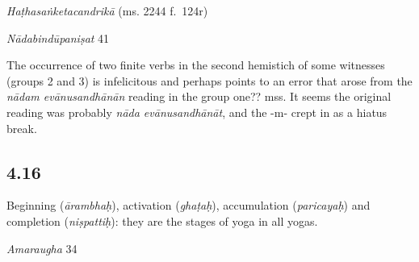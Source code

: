 \begin{ekdosis}
\begin{testimonia}[hp04_015]
\emph{Haṭhasaṅketacandrikā} (ms. 2244 f.~124r)
\begin{versinnote}
\end{versinnote}

\emph{Nādabindūpaniṣat} 41
\begin{versinnote}
\end{versinnote}
\end{testimonia}

\begin{philcomm}[hp04_015]
The occurrence of two finite verbs in the second hemistich of some witnesses (groups 2 and 3) is infelicitous and perhaps points to an error that arose from the \textit{nādam evānusandhānān} reading in the group one?? mss. It seems the original reading was probably \textit{nāda evānusandhānāt}, and the -m- crept in as a hiatus break.
\end{philcomm}

\subsection*{4.16}
\begin{translation}[hp04_016]
Beginning (\emph{ārambhaḥ}), activation (\emph{ghaṭaḥ}), accumulation (\emph{paricayaḥ}) and completion (\emph{niṣpattiḥ}): they are the stages of yoga in all yogas.
\end{translation}

\begin{sources}[hp04_016]
\emph{Amaraugha} 34
\begin{versinnote}
\tl{\var{cetasas tasya bhūmikāḥ ] $\beta$ : yogāvasthā caturvidhā $\theta$}\\!}%
\end{versinnote}


\end{sources}
\end{ekdosis}

